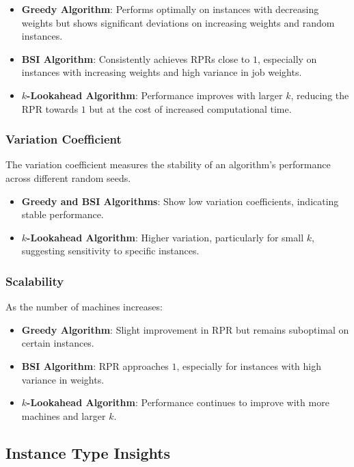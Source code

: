 \begin{itemize}
    \item \textbf{Greedy Algorithm}: Performs optimally on instances with decreasing weights but shows significant deviations on increasing weights and random instances.
    \item \textbf{BSI Algorithm}: Consistently achieves RPRs close to $1$, especially on instances with increasing weights and high variance in job weights.
    \item \textbf{$k$-Lookahead Algorithm}: Performance improves with larger $k$, reducing the RPR towards $1$ but at the cost of increased computational time.
\end{itemize}

\subsubsection*{Variation Coefficient}

The variation coefficient measures the stability of an algorithm's performance across different random seeds.

\begin{itemize}
    \item \textbf{Greedy and BSI Algorithms}: Show low variation coefficients, indicating stable performance.
    \item \textbf{$k$-Lookahead Algorithm}: Higher variation, particularly for small $k$, suggesting sensitivity to specific instances.
\end{itemize}

\subsubsection*{Scalability}

As the number of machines increases:

\begin{itemize}
    \item \textbf{Greedy Algorithm}: Slight improvement in RPR but remains suboptimal on certain instances.
    \item \textbf{BSI Algorithm}: RPR approaches $1$, especially for instances with high variance in weights.
    \item \textbf{$k$-Lookahead Algorithm}: Performance continues to improve with more machines and larger $k$.
\end{itemize}

\subsection*{Instance Type Insights}

